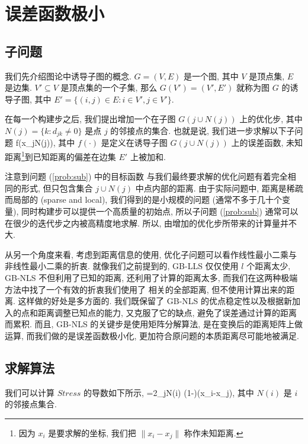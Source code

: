 \section{误差函数极小}
\label{sec:opt}
\subsection{子问题}
我们先介绍图论中诱导子图的概念. 
$G=(V,E)$ 是一个图, 其中 $V$ 是顶点集, $E$ 是边集.
$V'\subseteq V$ 是顶点集的一个子集, 
那么 $G(V')=(V',E')$ 就称为图 $G$ 的诱导子图, 
其中 $E'=\{(i,j)\in E: i\in V', j\in V'\}$.

在每一个构建步之后, 我们提出增加一个在子图 $G(j\cup N(j))$ 上的优化步, 
其中 $N(j)=\{k: d_{jk}\neq 0\}$ 是点 $j$ 的邻接点的集合. 
也就是说, 我们进一步求解以下子问题
\be \min  f(x_{j\cup N(j)}), \label{prob:sub}\ee
其中 $f(\cdot)$ 是定义在诱导子图 $G(j\cup N(j))$ 上的误差函数, 
未知距离\footnote{因为 $x_i$ 是要求解的坐标, 我们把 $\|x_i-x_j\|$ 称作未知距离.}到已知距离的偏差在边集 $E'$ 上被加和. 

注意到问题 (\ref{prob:sub}) 中的目标函数
与我们最终要求解的优化问题有着完全相同的形式,
但只包含集合 $j\cup N(j)$ 中点内部的距离.
由于实际问题中, 距离是稀疏而局部的 (sparse and local),
我们得到的是小规模的问题 (通常不多于几十个变量),
同时构建步可以提供一个高质量的初始点,
所以子问题 (\ref{prob:sub}) 通常可以在很少的迭代步之内被高精度地求解.
所以, 由增加的优化步所带来的计算量并不大.

从另一个角度来看, 考虑到距离信息的使用,
优化子问题可以看作线性最小二乘与非线性最小二乘的折衷.
就像我们之前提到的, GB-LLS 仅仅使用 $l$ 个距离\pozhe 太少,
GB-NLS 不但利用了已知的距离, 还利用了计算的距离\pozhe 太多, 
而我们在这两种极端方法中找了一个有效的折衷\pozhe 我们使用了
相关的全部距离, 但不使用计算出来的距离.
这样做的好处是多方面的.
我们既保留了 GB-NLS 的优点\pozhe 稳定性以及根据新加入的点和距离调整已知点的能力,
又克服了它的缺点, 避免了误差通过计算的距离而累积.
而且, GB-NLS 的关键步是使用矩阵分解算法,
是在变换后的距离矩阵上做运算,
而我们做的是误差函数极小化, 
更加符合原问题的本质\pozhe 距离尽可能地被满足.

\subsection{求解算法}
我们可以计算 $Stress$ 的导数如下所示,
\be {}=2\sum_{j\in N(i)} \Big(1-\Big)(x_i-x_j), \label{gradient}\ee
其中 $N(i)$ 是 $i$ 的邻接点集合.

